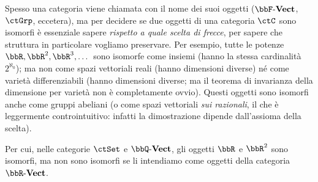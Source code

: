 \begin{warning}
 Spesso una categoria viene chiamata con il nome dei suoi oggetti (\(\ctVect\), \(\ctGrp\), eccetera), ma per decidere se due oggetti di una categoria \(\ctC\) sono isomorfi è essenziale sapere \emph{rispetto a quale scelta di frecce}, per sapere che struttura in particolare vogliamo preservare. Per esempio, tutte le potenze \(\bbR,\bbR^2,\bbR^3,\dots\) sono isomorfe come insiemi (hanno la stessa cardinalità \(2^{\aleph_0}\)); ma non come spazi vettoriali reali (hanno dimensioni diverse) né come varietà differenziabili (hanno dimensioni diverse; ma il teorema di invarianza della dimensione per varietà non è completamente ovvio). Questi oggetti sono isomorfi anche come gruppi abeliani (o come spazi vettoriali \emph{sui razionali}, il che è leggermente controintuitivo: infatti la dimostrazione dipende dall'assioma della scelta).

 Per cui, nelle categorie \(\ctSet\) e \(\ctVect[\bbQ]\), gli oggetti \(\bbR\) e \(\bbR^2\) sono isomorfi, ma non sono isomorfi se li intendiamo come oggetti della categoria \(\ctVect[\bbR]\).
\end{warning}

